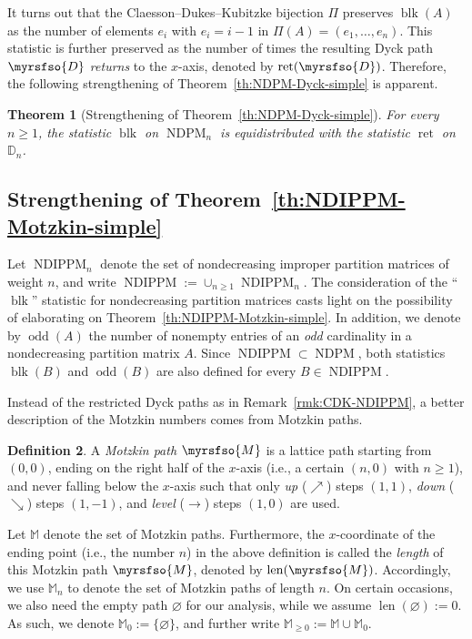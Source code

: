 \documentclass[12pt,reqno]{amsart}
\numberwithin{equation}{section}
\theoremstyle{theorem}
\newtheorem{theorem}{Theorem}[section]
\theoremstyle{definition}
\newtheorem{definition}[theorem]{Definition}
\theoremstyle{named}
\newcommand{\NDIPPM}{\operatorname{NDIPPM}}
\newcommand{\NDPM}{\operatorname{NDPM}}
\newcommand{\odd}{\operatorname{odd}}
\newcommand{\blk}{\operatorname{blk}}
\newcommand{\len}{\operatorname{len}}
\newcommand{\touch}{\operatorname{ret}}
\newcommand{\cM}{\myrsfso{M}}
\newcommand{\bbM}{\mathbb{M}}
\newcommand{\cD}{\myrsfso{D}}
\newcommand{\bbD}{\mathbb{D}}
\begin{document}
It turns out that the Claesson--Dukes--Kubitzke bijection $\Pi$ preserves $\blk(A)$ as the number of elements $e_i$ with $e_i=i-1$ in $\Pi(A) = (e_1,\ldots,e_n)$. This statistic is further preserved as the number of times the resulting Dyck path $\cD$ \emph{returns} to the $x$-axis, denoted by $\touch(\cD)$. Therefore, the following strengthening of Theorem~\ref{th:NDPM-Dyck-simple} is apparent.

\begin{theorem}[Strengthening of Theorem~\ref{th:NDPM-Dyck-simple}]\label{th:NDPM-Dyck}
	For every $n\ge 1$, the statistic $\blk$ on $\NDPM_n$ is equidistributed with the statistic $\touch$ on $\bbD_n$.
\end{theorem}

\subsection{Strengthening of Theorem~\ref{th:NDIPPM-Motzkin-simple}}\label{sec:th-NDIPPM-strong}

Let $\NDIPPM_n$ denote the set of nondecreasing improper partition matrices of weight $n$, and write $\NDIPPM := \cup_{n\ge 1} \NDIPPM_n$. The consideration of the ``$\blk$'' statistic for nondecreasing partition matrices casts light on the possibility of elaborating on Theorem~\ref{th:NDIPPM-Motzkin-simple}. In addition, we denote by $\odd(A)$ the number of nonempty entries of an \emph{odd} cardinality in a nondecreasing partition matrix $A$. Since $\NDIPPM \subset \NDPM$, both statistics $\blk(B)$ and $\odd(B)$ are also defined for every $B\in \NDIPPM$.

Instead of the restricted Dyck paths as in Remark~\ref{rmk:CDK-NDIPPM}, a better description of the Motzkin numbers comes from Motzkin paths.

\begin{definition}\label{def:M-path}
	A \emph{Motzkin path} $\cM$ is a lattice path starting from $(0,0)$, ending on the right half of the $x$-axis (i.e., a certain $(n,0)$ with $n\ge 1$), and never falling below the $x$-axis such that only \emph{up} ($\nearrow$) steps $(1,1)$, \emph{down} ($\searrow$) steps $(1,-1)$, and \emph{level} ($\rightarrow$) steps $(1,0)$ are used.
\end{definition}

Let $\bbM$ denote the set of Motzkin paths. Furthermore, the $x$-coordinate of the ending point (i.e., the number $n$) in the above definition is called the \emph{length} of this Motzkin path $\cM$, denoted by $\len(\cM)$. Accordingly, we use $\bbM_n$ to denote the set of Motzkin paths of length $n$. On certain occasions, we also need the empty path $\varnothing$ for our analysis, while we assume $\len(\varnothing) := 0$. As such, we denote $\bbM_0 := \{\varnothing\}$, and further write $\bbM_{\ge 0} := \bbM \cup \bbM_0$.
\end{document}
